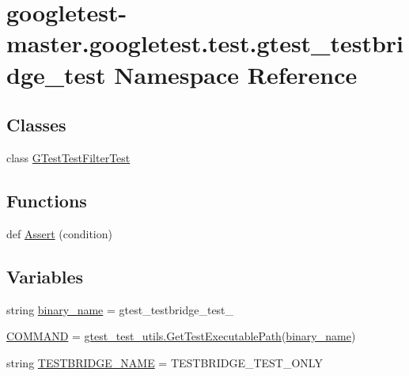 \hypertarget{namespacegoogletest-master_1_1googletest_1_1test_1_1gtest__testbridge__test}{}\section{googletest-\/master.googletest.\+test.\+gtest\+\_\+testbridge\+\_\+test Namespace Reference}
\label{namespacegoogletest-master_1_1googletest_1_1test_1_1gtest__testbridge__test}
\subsection*{Classes}
\begin{DoxyCompactItemize}
\item 
class \mbox{\hyperlink{classgoogletest-master_1_1googletest_1_1test_1_1gtest__testbridge__test_1_1_g_test_test_filter_test}{G\+Test\+Test\+Filter\+Test}}
\end{DoxyCompactItemize}
\subsection*{Functions}
\begin{DoxyCompactItemize}
\item 
def \mbox{\hyperlink{namespacegoogletest-master_1_1googletest_1_1test_1_1gtest__testbridge__test_a79e562adf464d7b44d221a77f3e2ac7a}{Assert}} (condition)
\end{DoxyCompactItemize}
\subsection*{Variables}
\begin{DoxyCompactItemize}
\item 
string \mbox{\hyperlink{namespacegoogletest-master_1_1googletest_1_1test_1_1gtest__testbridge__test_a61d45a2f7d0ff15c80eca60d04ea0272}{binary\+\_\+name}} = \textquotesingle{}gtest\+\_\+testbridge\+\_\+test\+\_\+\textquotesingle{}
\item 
\mbox{\hyperlink{namespacegoogletest-master_1_1googletest_1_1test_1_1gtest__testbridge__test_a8197724a49cb0ae372738cbd15b321f9}{C\+O\+M\+M\+A\+ND}} = \mbox{\hyperlink{namespacegoogletest-master_1_1googletest_1_1test_1_1gtest__test__utils_a78bbc69ac699e750a6a29188caa643c4}{gtest\+\_\+test\+\_\+utils.\+Get\+Test\+Executable\+Path}}(\mbox{\hyperlink{namespacegoogletest-master_1_1googletest_1_1test_1_1gtest__testbridge__test_a61d45a2f7d0ff15c80eca60d04ea0272}{binary\+\_\+name}})
\item 
string \mbox{\hyperlink{namespacegoogletest-master_1_1googletest_1_1test_1_1gtest__testbridge__test_a5d62a403331d71892d7e0952513fe6ed}{T\+E\+S\+T\+B\+R\+I\+D\+G\+E\+\_\+\+N\+A\+ME}} = \textquotesingle{}T\+E\+S\+T\+B\+R\+I\+D\+G\+E\+\_\+\+T\+E\+S\+T\+\_\+\+O\+N\+LY\textquotesingle{}
\end{DoxyCompactItemize}


